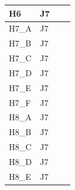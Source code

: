 \begin{longtable}{|l|l|l|l|}
H6                           & J7                                                &                                                  &                                                  \\ \hline
H7\_A                           & J7                                                &                                                  &                                                  \\ \hline
H7\_B                           & J7                                                &                                                  &                                                  \\ \hline
H7\_C                           & J7                                                &                                                  &                                                  \\ \hline
H7\_D                           & J7                                                &                                                  &                                                  \\ \hline
H7\_E                           & J7                                                &                                                  &                                                  \\ \hline
H7\_F                           & J7                                                &                                                  &                                                  \\ \hline
H8\_A                           & J7                                                &                                                  &                                                  \\ \hline
H8\_B                           & J7                                                &                                                  &                                                  \\ \hline
H8\_C                           & J7                                                &                                                  &                                                  \\ \hline
H8\_D                           & J7                                                &                                                  &                                                  \\ \hline
H8\_E                           & J7                                                &                                                  &                                                  \\ \hline

\end{longtable}
